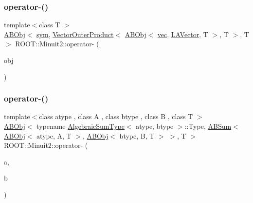 \subsubsection{\texorpdfstring{operator-\/()}{operator-()}\hspace{0.1cm}{\footnotesize\ttfamily [2/4]}}
{\footnotesize\ttfamily template$<$class T $>$ \\
\mbox{\hyperlink{classROOT_1_1Minuit2_1_1ABObj}{A\+B\+Obj}}$<$ \mbox{\hyperlink{classROOT_1_1Minuit2_1_1sym}{sym}}, \mbox{\hyperlink{classROOT_1_1Minuit2_1_1VectorOuterProduct}{Vector\+Outer\+Product}}$<$ \mbox{\hyperlink{classROOT_1_1Minuit2_1_1ABObj}{A\+B\+Obj}}$<$ \mbox{\hyperlink{classROOT_1_1Minuit2_1_1vec}{vec}}, \mbox{\hyperlink{classROOT_1_1Minuit2_1_1LAVector}{L\+A\+Vector}}, T $>$, T $>$, T $>$ R\+O\+O\+T\+::\+Minuit2\+::operator-\/ (\begin{DoxyParamCaption}\item[{const \mbox{\hyperlink{classROOT_1_1Minuit2_1_1ABObj}{A\+B\+Obj}}$<$ \mbox{\hyperlink{classROOT_1_1Minuit2_1_1sym}{sym}}, \mbox{\hyperlink{classROOT_1_1Minuit2_1_1VectorOuterProduct}{Vector\+Outer\+Product}}$<$ \mbox{\hyperlink{classROOT_1_1Minuit2_1_1ABObj}{A\+B\+Obj}}$<$ \mbox{\hyperlink{classROOT_1_1Minuit2_1_1vec}{vec}}, \mbox{\hyperlink{classROOT_1_1Minuit2_1_1LAVector}{L\+A\+Vector}}, T $>$, T $>$, T $>$ \&}]{obj }\end{DoxyParamCaption})\hspace{0.3cm}{\ttfamily [inline]}}

\mbox{\label{namespaceROOT_1_1Minuit2_ad72d0b214406e2325a87fe10b052b9ad}} 
\subsubsection{\texorpdfstring{operator-\/()}{operator-()}\hspace{0.1cm}{\footnotesize\ttfamily [3/4]}}
{\footnotesize\ttfamily template$<$class atype , class A , class btype , class B , class T $>$ \\
\mbox{\hyperlink{classROOT_1_1Minuit2_1_1ABObj}{A\+B\+Obj}}$<$ typename \mbox{\hyperlink{classROOT_1_1Minuit2_1_1AlgebraicSumType}{Algebraic\+Sum\+Type}}$<$ atype, btype $>$\+::Type, \mbox{\hyperlink{classROOT_1_1Minuit2_1_1ABSum}{A\+B\+Sum}}$<$ \mbox{\hyperlink{classROOT_1_1Minuit2_1_1ABObj}{A\+B\+Obj}}$<$ atype, A, T $>$, \mbox{\hyperlink{classROOT_1_1Minuit2_1_1ABObj}{A\+B\+Obj}}$<$ btype, B, T $>$ $>$, T $>$ R\+O\+O\+T\+::\+Minuit2\+::operator-\/ (\begin{DoxyParamCaption}\item[{const \mbox{\hyperlink{classROOT_1_1Minuit2_1_1ABObj}{A\+B\+Obj}}$<$ atype, A, T $>$ \&}]{a,  }\item[{const \mbox{\hyperlink{classROOT_1_1Minuit2_1_1ABObj}{A\+B\+Obj}}$<$ btype, B, T $>$ \&}]{b }\end{DoxyParamCaption})\hspace{0.3cm}{\ttfamily [inline]}}

